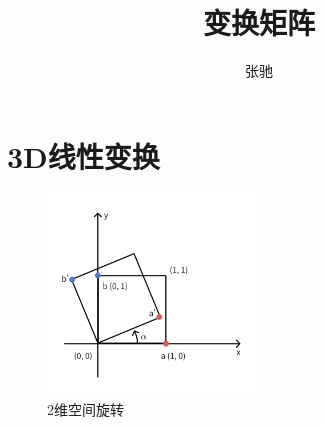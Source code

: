 \documentclass[letterpaper,11pt]{article}
\numberwithin{equation}{section}
\begin{document}
\title{变换矩阵}
\author{张驰}
\maketitle

\section{3D线性变换}

\begin{figure}
    \begin{center}
        \includegraphics[width=0.5\textwidth]{imgs/2d-rotate.png}
    \end{center}
    \caption{\label{fig:2d-rotate}2维空间旋转}
\end{figure}
\end{document}
